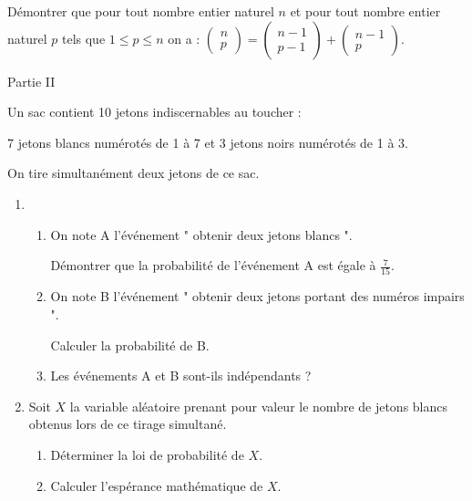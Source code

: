 Démontrer que pour tout nombre entier naturel $n$ et pour tout nombre entier naturel $p$ tels que $1  \leqslant  p  \leqslant  n$ on a : $\begin{pmatrix} n \\ p\end{pmatrix}=\begin{pmatrix} n-1 \\ p-1\end{pmatrix} + \begin{pmatrix} n-1 \\ p \end{pmatrix}$.
\begin{h3}Partie II\end{h3}
Un sac contient 10 jetons indiscernables au toucher :
\par
7 jetons blancs numérotés de 1 à 7 et 3 jetons noirs numérotés de 1 à 3.
\par
On tire simultanément deux jetons de ce sac.
\begin{enumerate}
     \item
     \begin{enumerate}[label=\alph*.]
          \item
          On note A l'événement " obtenir deux jetons blancs ".
          \par
          Démontrer que la probabilité de l'événement A est égale à $\frac{7}{15}$.
          \item
          On note B l'événement " obtenir deux jetons portant des numéros impairs ".
          \par
          Calculer la probabilité de B.
          \item
          Les événements A et B sont-ils indépendants ?
     \end{enumerate}
     \item
     Soit $X$ la variable aléatoire prenant pour valeur le nombre de jetons blancs obtenus lors de ce tirage simultané.
     \begin{enumerate}[label=\alph*.]
          \item
          Déterminer la loi de probabilité de $X$.
          \item
          Calculer l'espérance mathématique de $X$.
     \end{enumerate}
\end{enumerate}
